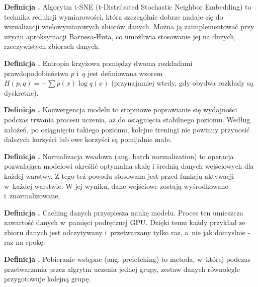 \noindent
\textbf{Definicja .}
\incrementdefinitionIndex
Algorytm t-SNE (t-Distributed Stochastic Neighbor Embedding) to technika redukcji wymiarowości,
która szczególnie dobrze nadaje się do wizualizacji wielowymiarowych zbiorów danych.
Można ją zaimplementować przy użyciu aproksymacji Barnesa-Huta,
co umożliwia stosowanie jej na dużych, rzeczywistych zbiorach danych.

\noindent
\textbf{Definicja .}
\incrementdefinitionIndex
Entropia krzyżowa pomiędzy dwoma rozkładami prawdopodobieństwa $p$ i~$q$ jest definiowana wzorem
$H(p,q) = -\sum p(x) \log q(x) $ (przynajmniej wtedy, gdy obydwa rozkłady są dyskretne).

\noindent
\textbf{Definicja .}
\incrementdefinitionIndex
Konwergencja modelu to stopniowe poprawianie się wydajności podczas trwania procesu uczenia,
aż do osiągnięcia stabilnego poziomu. Według założeń, po osiągnięciu takiego poziomu,
kolejne treningi nie powinny przynosić dalszych korzyści lub owe korzyści są pomijalnie małe.

\noindent
\textbf{Definicja .}
\incrementdefinitionIndex
Normalizacja wsadowa (ang. batch normalization) to operacja pozwalająca modelowi określić optymalną skalę
i średnią danych wejściowych dla każdej warstwy.
Z tego też powodu stosowana jest przed funkcją aktywacji w~każdej warstwie.
W jej wyniku, dane wejściowe zostają wyśrodkowane i~znormalizowane,

\noindent
\textbf{Definicja .}
\incrementdefinitionIndex
Caching danych przyspiesza naukę modelu. Proces ten umieszcza zawartość danych w~pamięci podręcznej GPU.
Dzięki temu każdy przykład ze zbioru danych jest odczytywany i~przetwarzany tylko raz, a~nie jak domyslnie - raz na epokę.

\noindent
\textbf{Definicja .}
\incrementdefinitionIndex
Pobieranie wstępne (ang. prefetching) to metoda, w~której podczas przetwarzania przez algrytm uczenia jednej grupy,
zestaw danych równolegle przygotowuje kolejną grupę.
